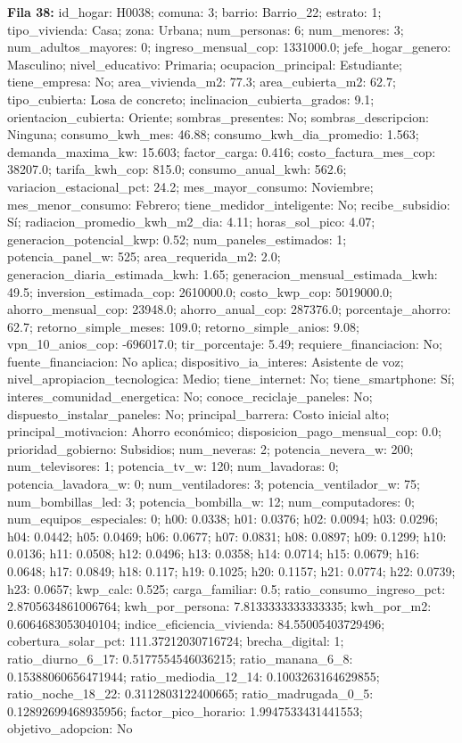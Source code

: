 {\footnotesize\textbf{Fila 38:} id\_hogar: H0038; comuna: 3; barrio: Barrio\_22; estrato: 1; tipo\_vivienda: Casa; zona: Urbana; num\_personas: 6; num\_menores: 3; num\_adultos\_mayores: 0; ingreso\_mensual\_cop: 1331000.0; jefe\_hogar\_genero: Masculino; nivel\_educativo: Primaria; ocupacion\_principal: Estudiante; tiene\_empresa: No; area\_vivienda\_m2: 77.3; area\_cubierta\_m2: 62.7; tipo\_cubierta: Losa de concreto; inclinacion\_cubierta\_grados: 9.1; orientacion\_cubierta: Oriente; sombras\_presentes: No; sombras\_descripcion: Ninguna; consumo\_kwh\_mes: 46.88; consumo\_kwh\_dia\_promedio: 1.563; demanda\_maxima\_kw: 15.603; factor\_carga: 0.416; costo\_factura\_mes\_cop: 38207.0; tarifa\_kwh\_cop: 815.0; consumo\_anual\_kwh: 562.6; variacion\_estacional\_pct: 24.2; mes\_mayor\_consumo: Noviembre; mes\_menor\_consumo: Febrero; tiene\_medidor\_inteligente: No; recibe\_subsidio: Sí; radiacion\_promedio\_kwh\_m2\_dia: 4.11; horas\_sol\_pico: 4.07; generacion\_potencial\_kwp: 0.52; num\_paneles\_estimados: 1; potencia\_panel\_w: 525; area\_requerida\_m2: 2.0; generacion\_diaria\_estimada\_kwh: 1.65; generacion\_mensual\_estimada\_kwh: 49.5; inversion\_estimada\_cop: 2610000.0; costo\_kwp\_cop: 5019000.0; ahorro\_mensual\_cop: 23948.0; ahorro\_anual\_cop: 287376.0; porcentaje\_ahorro: 62.7; retorno\_simple\_meses: 109.0; retorno\_simple\_anios: 9.08; vpn\_10\_anios\_cop: -696017.0; tir\_porcentaje: 5.49; requiere\_financiacion: No; fuente\_financiacion: No aplica; dispositivo\_ia\_interes: Asistente de voz; nivel\_apropiacion\_tecnologica: Medio; tiene\_internet: No; tiene\_smartphone: Sí; interes\_comunidad\_energetica: No; conoce\_reciclaje\_paneles: No; dispuesto\_instalar\_paneles: No; principal\_barrera: Costo inicial alto; principal\_motivacion: Ahorro económico; disposicion\_pago\_mensual\_cop: 0.0; prioridad\_gobierno: Subsidios; num\_neveras: 2; potencia\_nevera\_w: 200; num\_televisores: 1; potencia\_tv\_w: 120; num\_lavadoras: 0; potencia\_lavadora\_w: 0; num\_ventiladores: 3; potencia\_ventilador\_w: 75; num\_bombillas\_led: 3; potencia\_bombilla\_w: 12; num\_computadores: 0; num\_equipos\_especiales: 0; h00: 0.0338; h01: 0.0376; h02: 0.0094; h03: 0.0296; h04: 0.0442; h05: 0.0469; h06: 0.0677; h07: 0.0831; h08: 0.0897; h09: 0.1299; h10: 0.0136; h11: 0.0508; h12: 0.0496; h13: 0.0358; h14: 0.0714; h15: 0.0679; h16: 0.0648; h17: 0.0849; h18: 0.117; h19: 0.1025; h20: 0.1157; h21: 0.0774; h22: 0.0739; h23: 0.0657; kwp\_calc: 0.525; carga\_familiar: 0.5; ratio\_consumo\_ingreso\_pct: 2.8705634861006764; kwh\_por\_persona: 7.8133333333333335; kwh\_por\_m2: 0.6064683053040104; indice\_eficiencia\_vivienda: 84.55005403729496; cobertura\_solar\_pct: 111.37212030716724; brecha\_digital: 1; ratio\_diurno\_6\_17: 0.5177554546036215; ratio\_manana\_6\_8: 0.15388060656471944; ratio\_mediodia\_12\_14: 0.1003263164629855; ratio\_noche\_18\_22: 0.3112803122400665; ratio\_madrugada\_0\_5: 0.12892699468935956; factor\_pico\_horario: 1.9947533431441553; objetivo\_adopcion: No\par}
